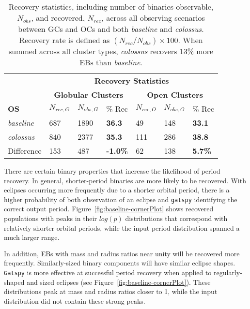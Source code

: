 \documentclass[RNAAS]{aastex63}
\begin{document}
\begin{table}%
    \centering
    \begin{tabular}{lllllll}
    
    & \multicolumn{6}{c}{{\textbf{Recovery Statistics}}} \\
    {\textbf{}} & \multicolumn{3}{c}{{ \textbf{Globular Clusters}}} & \multicolumn{3}{c}{\textbf{Open Clusters}} \\
    \textbf{OS} &  $N_{rec,G}$ & $N_{obs,G}$ & \% Rec & $N_{rec,O}$ &  $N_{obs,O}$ & \% Rec \\
    \hline
    \textit{baseline} & 687 & 1890  & \textbf{36.3} &  49 & 148 & \textbf{33.1} \\
    \textit{colossus} & 840 & 2377 & \textbf{35.3} & 111 & 286 & \textbf{38.8} \\
    Difference & 153 & 487 & \textbf{-1.0\%} & 62 & 138 &  \textbf{5.7\%} \\
    
    \end{tabular}
    \caption{Recovery statistics, including number of binaries observable, $N_{obs}$, and  recovered, $N_{rec}$, across all observing scenarios between GCs and OCs and both \textit{baseline} and \textit{colossus}. Recovery rate is defined as $(N_{rec}/N_{obs}) \times 100$. When summed across all cluster types, \textit{colossus} recovers 13\% more EBs than \textit{baseline}.}
    \label{tab:recovery_table}

\end{table}


There are certain binary properties that increase the likelihood of period recovery. In general, shorter-period binaries are more likely to be recovered. With eclipses occurring more frequently due to a shorter orbital period, there is a higher probability of both observation of an eclipse and \texttt{gatspy} identifying the correct output period. Figure~\ref{fig:baseline-cornerPlot} shows recovered populations with peaks in their $log(p)$ distributions that correspond with relatively shorter orbital periods, while the input period distribution spanned a much larger range.

In addition, EBs with mass and radius ratios near unity will be recovered more frequently. Similarly-sized binary components will have similar eclipse shapes. \texttt{Gatspy} is more effective at successful period recovery when applied to regularly-shaped and sized eclipses (see Figure~\ref{fig:baseline-cornerPlot}). These distributions peak at mass and radius ratios closer to 1, while the input distribution did not contain these strong peaks.
\end{document}
